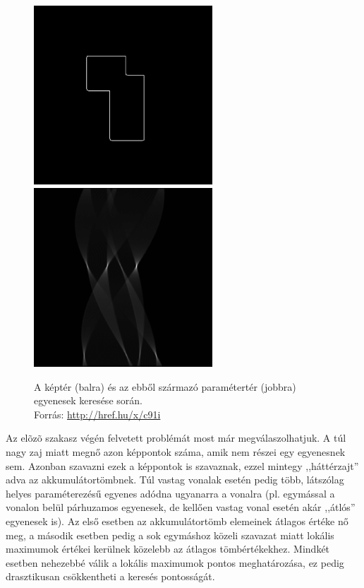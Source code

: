 \begin{figure}[!ht]
\centering
\includegraphics[width=67mm, keepaspectratio]{figures/houghparam_1.png}\hspace{1cm}
\includegraphics[width=67mm, keepaspectratio]{figures/houghparam_2.png}
\caption{A képtér (balra) és az ebből származó paramétertér (jobbra) egyenesek keresése során.\\Forrás: \url{http://href.hu/x/c91i}}
\label{fig:houghparam}
\end{figure}

Az elõzõ szakasz végén felvetett problémát most már megválaszolhatjuk. A túl nagy zaj miatt megnő azon képpontok száma, amik nem részei egy egyenesnek sem. Azonban szavazni ezek a képpontok is szavaznak, ezzel mintegy ,,háttérzajt'' adva az akkumulátortömbnek. Túl vastag vonalak esetén pedig több, látszólag helyes paraméterezésű egyenes adódna ugyanarra a vonalra (pl. egymással a vonalon belül párhuzamos egyenesek, de kellően vastag vonal esetén akár ,,átlós'' egyenesek is). Az első esetben az akkumulátortömb elemeinek átlagos értéke nő meg, a második esetben pedig a sok egymáshoz közeli szavazat miatt lokális maximumok értékei kerülnek közelebb az átlagos tömbértékekhez. Mindkét esetben nehezebbé válik a lokális maximumok pontos meghatározása, ez pedig drasztikusan csökkentheti a keresés pontosságát.

